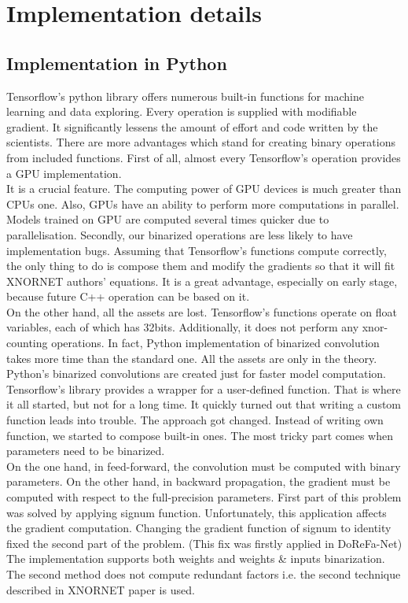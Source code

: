 \documentclass[licencjacka]{pracamgr}
\begin{document}
\chapter{Implementation details}

\section{Implementation in Python}
Tensorflow’s python library offers numerous built-in functions for machine learning and data exploring. Every operation is supplied with modifiable gradient. It significantly lessens the amount of effort and code written by the scientists. There are more advantages which stand for creating binary operations from included functions. First of all, almost every Tensorflow’s operation provides a GPU implementation. \\ It is a crucial feature. The computing power of GPU devices is much greater than CPUs one. Also, GPUs have an ability to perform more computations in parallel. Models trained on GPU are computed several times quicker due to parallelisation. Secondly, our binarized operations are less likely to have implementation bugs. Assuming that Tensorflow’s functions compute correctly, the only thing to do is compose them and modify the gradients so that it will fit XNORNET authors’ equations. It is a great advantage, especially on early stage, because future C++ operation can be based on it. \\ On the other hand, all the assets are lost. Tensorflow’s functions operate on float variables, each of which has 32bits. Additionally, it does not perform any xnor-counting operations. In fact, Python implementation of binarized convolution takes more time than the standard one. All the assets are only in the theory. Python’s binarized convolutions are created just for faster model computation. \\
		 
Tensorflow’s library provides a wrapper for a user-defined function. That is where it all started, but not for a long time. It quickly turned out that writing a custom function leads into trouble. The approach got changed. Instead of writing own function, we started to compose built-in ones. The most tricky part comes when parameters need to be binarized. \\ On the one hand, in feed-forward, the convolution must be computed with binary parameters. On the other hand, in backward propagation, the gradient must be computed with respect to the full-precision parameters. First part of this problem was solved by applying signum function. Unfortunately, this application affects the gradient computation. Changing the gradient function of signum to identity fixed the second part of the problem. (This fix was firstly applied in DoReFa-Net) The implementation supports both weights and weights \& inputs binarization. The second method does not compute redundant factors i.e. the second technique described in XNORNET paper is used.
\end{document}
